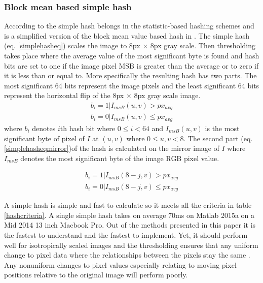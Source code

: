 \documentclass[english,12pt,a4paper,pdftex,elec,utf8, table]{aaltothesis}
\begin{document}
\subsubsection{Block mean based simple hash}\label{simplehash}
According to \cite[p. 20]{Hadmi2012} the simple hash belongs in the statistic-based hashing schemes and is a simplified version of the block mean value based hash in \cite{Yang2006}. The simple hash (eq. \ref{simplehasheq}) scales the image to 8px $\times$ 8px gray scale. Then thresholding takes place where the average value of the most significant byte is found and hash bits are set to one if the image pixel MSB is greater than the average or to zero if it is less than or equal to. More specifically the resulting hash has two parts. The most significant 64 bits represent the image pixels and the least significant 64 bits represent the horizontal flip of the 8px $\times$ 8px gray scale image.
\begin{equation} \label{simplehasheq}
  \begin{split}
  b_{i} = 1 | I_{msB}(u,v) > px_{avg}\\
  b_{i} = 0 | I_{msB}(u,v) \leq px_{avg}
  \end{split}
\end{equation}
where $b_{i}$ denotes $i$th hash bit where $0 \leq i < 64$ and $I_{msB}(u,v)$ is the most significant byte of pixel of $I$ at $(u,v)$ where $0 \leq u,v < 8$. The second part (eq. \ref{simplehasheqmirror})of the hash is calculated on the mirror image of $I$ where $I_{msB}$ denotes the most significant byte of the image RGB pixel value.

\begin{equation} \label{simplehasheqmirror}
  \begin{split}
  b_{i} = 1 | I_{msB}(8-j,v) > px_{avg}\\
  b_{i} = 0 | I_{msB}(8-j,v) \leq px_{avg}
  \end{split}
\end{equation}

A simple hash is simple and fast to calculate so it meets all the criteria in table \ref{hashcriteria}. A single simple hash takes on average 70ms on Matlab 2015a on a Mid 2014 13 inch Macbook Pro. Out of the methods presented in this paper it is the fastest to understand and the fastest to implement. Yet, it should perform well for isotropically scaled images and the thresholding ensures that any uniform change to pixel data where the relationships between the pixels stay the same \cite{Zauner2010}. Any nonuniform changes to pixel values especially relating to moving pixel positions relative to the original image will perform poorly.
\end{document}
